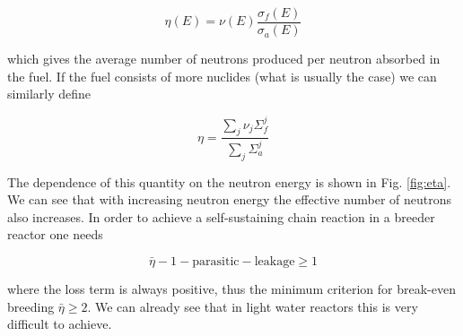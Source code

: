 \begin{equation}
\eta(E)=\nu(E)\frac{\sigma_f(E)}{\sigma_a(E)}
\end{equation}

\noindent which gives the average number of neutrons produced per neutron absorbed in the fuel. If the fuel consists of more nuclides (what is usually the case) we can similarly define

\[
\eta=\frac{\sum_j\nu_j\Sigma_f^j}{\sum_j\Sigma_a^j}
\]

The dependence of this quantity on the neutron energy is shown in Fig. \ref{fig:eta}. We can see that with increasing neutron energy the effective number of neutrons also increases. In order to achieve a self-sustaining chain reaction in a breeder reactor one needs

\begin{equation}
\bar\eta-1-\mathrm{parasitic}-\mathrm{leakage}\geq 1
\end{equation}

\noindent where the loss term is always positive, thus the minimum criterion for break-even breeding $\bar\eta\geq 2$. We can already see that in light water reactors this is very difficult to achieve.




%